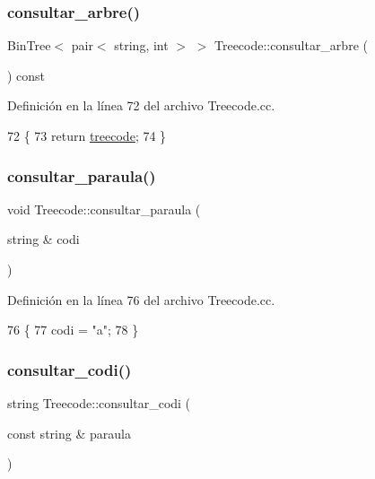 \subsubsection{\texorpdfstring{consultar\+\_\+arbre()}{consultar\_arbre()}}
{\footnotesize\ttfamily Bin\+Tree$<$ pair$<$ string, int $>$ $>$ Treecode\+::consultar\+\_\+arbre (\begin{DoxyParamCaption}{ }\end{DoxyParamCaption}) const}



Definición en la línea 72 del archivo Treecode.\+cc.


\begin{DoxyCode}
72                                                           \{
73     \textcolor{keywordflow}{return} \hyperlink{class_treecode_abd4467b0a13a57fcd3bddf4a60853372}{treecode};
74 \}    
\end{DoxyCode}
\mbox{\label{class_treecode_a3d3b580b42b739716f168d71cb0e3c8c}} 
\subsubsection{\texorpdfstring{consultar\+\_\+paraula()}{consultar\_paraula()}}
{\footnotesize\ttfamily void Treecode\+::consultar\+\_\+paraula (\begin{DoxyParamCaption}\item[{string \&}]{codi }\end{DoxyParamCaption})}



Definición en la línea 76 del archivo Treecode.\+cc.


\begin{DoxyCode}
76                                             \{
77     codi = \textcolor{stringliteral}{"a"};
78 \}
\end{DoxyCode}
\mbox{\label{class_treecode_adee719707b72a25e70e3c108d0bd60a1}} 
\subsubsection{\texorpdfstring{consultar\+\_\+codi()}{consultar\_codi()}}
{\footnotesize\ttfamily string Treecode\+::consultar\+\_\+codi (\begin{DoxyParamCaption}\item[{const string \&}]{paraula }\end{DoxyParamCaption})}



